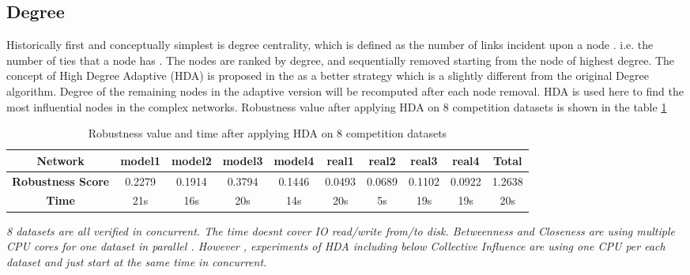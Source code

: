 \documentclass{article}
\begin{document}
	\subsection{Degree}		

	Historically first and conceptually simplest is degree centrality, which is defined as the number of links incident upon a node . i.e. the number of ties that a node has \cite{wikiCentrality}. The nodes are ranked by degree, and sequentially removed starting from the node of highest degree. The concept of High Degree Adaptive (HDA) is proposed in the \cite{morone2015influence} as a better strategy which is a slightly different from the original Degree algorithm. Degree of the remaining nodes in the adaptive version will be recomputed after each node removal. HDA is used here to find the most influential nodes in the complex networks. Robustness value after applying HDA on 8 competition datasets is shown in the table \ref{tab:table5}
	

		
	\begin{table}[!htbp]
		\begin{adjustwidth}{-1.3cm}{}		
			\begin{threeparttable}
				\centering
				\caption{Robustness value and time after applying HDA on 8 competition datasets}
				\label{tab:table5}
				
				\begin{tabular}{|c|c|c|c|c|c|c|c|c|c|}
					\hline
					\textbf{Network}          & \textbf{model1} & \textbf{model2} & \textbf{model3} & \textbf{model4} & \textbf{real1} & \textbf{real2} & \textbf{real3} & \textbf{real4} & \textbf{Total} \\ \hline
					\textbf{Robustness Score} & 0.2279          & 0.1914          & 0.3794          & 0.1446          & 0.0493         & 0.0689         & 0.1102         & 0.0922         & 1.2638         \\ \hline
					\textbf{Time}     & 21s             & 16s             & 20s             & 14s             & 20s            & 5s             & 19s            & 19s            & 20s            \\ \hline					
				\end{tabular}
				\begin{tablenotes}
					\small
					\item\textit{8 datasets are all verified in concurrent. The time doesn\textquotesingle t cover IO read/write from/to disk. Betweenness and Closeness are using multiple CPU cores for one dataset in parallel . However , experiments of HDA including below Collective Influence are using one CPU per each dataset and just start at the same time in concurrent.}
				\end{tablenotes}			
			\end{threeparttable}
		\end{adjustwidth}
	\end{table}
	
\end{document}
